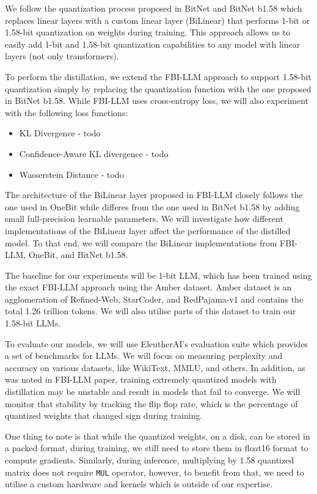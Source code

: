 \documentclass{article}
\begin{document}
 We follow the quantization process proposed in BitNet and BitNet b1.58 which replaces linear layers with a custom linear layer (BiLinear) that performs 1-bit or 1.58-bit quantization on weights during training. This approach allows us to easily add 1-bit and 1.58-bit quantization capabilities to any model with linear layers (not only transformers).

 To perform the distillation, we extend the FBI-LLM approach to support 1.58-bit quantization simply by replacing the quantization function with the one proposed in BitNet b1.58. While FBI-LLM uses cross-entropy loss, we will also experiment with the following loss functions:

\begin{itemize}
	\item KL Divergence - todo
	\item Confidence-Aware KL divergence - todo
	\item Wasserstein Distance - todo
\end{itemize}

The architecture of the BiLinear layer proposed in FBI-LLM closely follows the one used in OneBit \cite{onebit} while differes from the one used in BitNet b1.58 by adding small full-precision learnable parameters. We will investigate how different implementations of the BiLinear layer affect the performance of the distilled model. To that end, we will compare the BiLinear implementations from FBI-LLM, OneBit, and BitNet b1.58.

The baseline for our experiments will be 1-bit LLM, which has been trained using the exact FBI-LLM approach using the Amber dataset. Amber dataset is an agglomeration of Refined-Web, StarCoder, and RedPajama-v1 and contains the total 1.26 trillion tokens. We will also utilise parts of this dataset to train our 1.58-bit LLMs.

To evaluate our models, we will use EleutherAI's evaluation suite which provides a set of benchmarks for LLMs. We will focus on measuring perplexity and accuracy on various datasets, like WikiText, MMLU, and others. In addition, as was noted in FBI-LLM paper, training extremely quantized models with distillation may be unstable and result in models that fail to converge. We will monitor that stability by tracking the flip flop rate, which is the percentage of quantized weights that changed sign during training.

One thing to note is that while the quantized weights, on a disk, can be stored in a packed format, during training, we still need to store them in float16 format to compute gradients. Similarly, during inference, multiplying by 1.58 quantized matrix does not require \verb|MUL| operator, however, to benefit from that, we need to utilise a custom hardware and kernels which is outside of our expertise.


\end{document}
